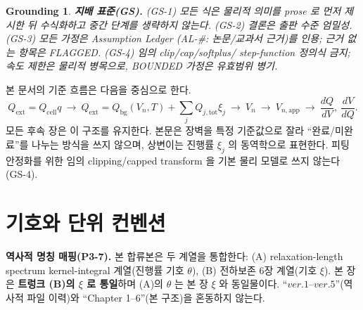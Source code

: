 \documentclass[11pt,a4paper]{article}
\newtheorem*{groundingbox}{Grounding}
\newcommand{\app}{\mathrm{app}}
\newcommand{\tot}{\mathrm{tot}}
\newcommand{\bg}{\mathrm{bg}}
\newcommand{\cell}{\mathrm{cell}}
\newcommand{\ext}{\mathrm{ext}}
\begin{document}
\begin{groundingbox}
\textbf{지배 표준(GS).} (GS-1) 모든 식은 물리적 의미를 prose 로 먼저 제시한 뒤 수식화하고 중간
단계를 생략하지 않는다. (GS-2) 결론은 출판 수준 엄밀성. (GS-3) 모든 가정은 Assumption Ledger
(AL-\#: 논문/교과서 근거)를 인용; 근거 없는 항목은 FLAGGED. (GS-4) 임의 clip/cap/softplus/
step-function 정의식 금지; 속도 제한은 물리적 병목으로, BOUNDED 가정은 유효범위 병기.
\end{groundingbox}

본 문서의 기준 흐름은 다음을 중심으로 한다.
\begin{equation}
Q_\ext=Q_\cell q
\ \rightarrow\
Q_\ext=Q_\bg(V_n,T)+\sum_j Q_{j,\tot}\xi_j
\ \rightarrow\
V_n
\ \rightarrow\
V_{n,\app}
\ \rightarrow\
\frac{dQ}{dV},\ \frac{dV}{dQ}.
\label{eq:masterflow}
\end{equation}
모든 후속 장은 이 구조를 유지한다. 본문은 장벽을 특정 기준값으로 잘라 ``완료/미완료''를 나누는
방식을 쓰지 않으며, 상변이는 진행률 $\xi_j$ 의 동역학으로 표현한다. 피팅 안정화를 위한 임의
clipping/capped transform 을 기본 물리 모델로 쓰지 않는다(GS-4).

\tableofcontents
\newpage

\section{기호와 단위 컨벤션}\label{sec:notation}
\textbf{역사적 명칭 매핑(P3-7).} 본 합류본은 두 계열을 통합한다: (A) relaxation-length spectrum
kernel-integral 계열(진행률 기호 $\theta$), (B) 전하보존 6장 계열(기호 $\xi$). 본 장은 \textbf{트렁크
(B)의 $\xi$ 로 통일}하며 (A)의 $\theta$ 는 본 장 $\xi$ 와 동일물이다. ``$ver.1$--$ver.5$''(역사적 파일
이력)와 ``Chapter 1--6''(본 구조)을 혼동하지 않는다.
\end{document}
